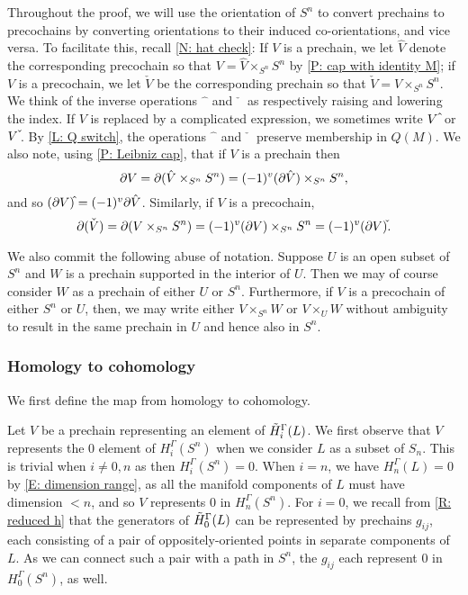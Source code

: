 Throughout the proof, we will use the orientation of $S^n$ to convert prechains to precochains by converting orientations to their induced co-orientations, and vice versa.
To facilitate this, recall \cref{N: hat check}:
If $V$ is a prechain, we let $\hat V$ denote the corresponding precochain so that $V = \hat V \times_{S^n} S^n$ by \cref{P: cap with identity M}; if $V$ is a precochain, we let $\check V$ be the corresponding prechain so that $\check V = V \times_{S^n} S^n$.
We think of the inverse operations $\hat{\phantom{a}}$ and $\check{\phantom{a}}$ as respectively raising and lowering the index.
If $V$ is replaced by a complicated expression, we sometimes write $V\,\hat{\vrule height1.3ex width0pt}$ or $V\,\check{\vrule height1.3ex width0pt}$.
By \cref{L: Q switch}, the operations $\hat{\phantom{a}}$ and $\check{\phantom{a}}$ preserve membership in $Q(M)$.
We also note, using \cref{P: Leibniz cap}, that if $V$ is a prechain then
$$\partial V = \partial(\hat V \times_{S^n} S^n) = (-1)^{v} (\partial \hat V) \times_{S^n} S^n,$$
and so $(\bd V)\hat{\vrule height1.3ex width0pt} = (-1)^{v} \bd \hat V$.
Similarly, if $V$ is a precochain, $$\bd(\check V) = \bd(V \times_{S^n} S^n) = (-1)^{v} (\bd V) \times_{S^n} S^n = (-1)^v (\bd V)\check{\vrule height1.3ex width0pt}.$$

We also commit the following abuse of notation.
Suppose $U$ is an open subset of $S^n$ and $W$ is a prechain supported in the interior of $U$.
Then we may of course consider $W$ as a prechain of either $U$ or $S^n$.
Furthermore, if $V$ is a precochain of either $S^n$ or $U$, then, we may write either $V \times_{S^n} W$ or $V \times_U W$ without ambiguity to result in the same prechain in $U$ and hence also in $S^n$.


\subsubsection{Homology to cohomology} We first define the map from homology to cohomology.

Let $V$ be a prechain representing an element of $\tilde H_i^\Gamma(L)$.
We first observe that $V$ represents the $0$ element of $H_i^\Gamma(S^n)$ when we consider $L$ as a subset of $S_n$.
This is trivial when $i \neq 0,n$ as then $H_i^\Gamma(S^n)=0$.
When $i = n$, we have $H_n^\Gamma(L) = 0$ by \cref{E: dimension range}, as all the manifold components of $L$ must have dimension $<n$, and so $V$ represents $0$ in $H_n^\Gamma(S^n)$.
For $i=0$, we recall from \cref{R: reduced h} that the generators of $\tilde H_0^\Gamma(L)$ can be represented by prechains $g_{ij}$, each consisting of a pair of oppositely-oriented points in separate components of $L$.
As we can connect such a pair with a path in $S^n$, the $g_{ij}$ each represent $0$ in $H_0^\Gamma(S^n)$, as well.

